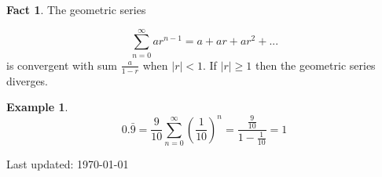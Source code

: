 \documentclass{article}
\theoremstyle{definition}
\newtheorem{fact}[thm]{Fact}
\newtheorem*{ex*}{Example}
\begin{document}
\begin{fact}
The geometric series
\end{fact}
\begin{equation*}
\sum_{n=0}^{\infty}ar^{n-1} = a + ar + ar^2 + ...
\end{equation*}
is convergent with sum $\frac{a}{1-r}$ when $|r| < 1$. If $|r| \geq 1$ then the geometric series diverges.

\begin{ex*} 
\begin {equation*}
0.\bar{9} = \frac{9}{10} \sum_{n=0}^{\infty}(\frac{1}{10})^n = \frac{\frac{9}{10}}{1-\frac{1}{10}} = 1
\end{equation*}
\end{ex*}

\begin{center}
  \begin{footnotesize}
    Last updated: \today \\
  \end{footnotesize}
\end{center}
\end{document}
